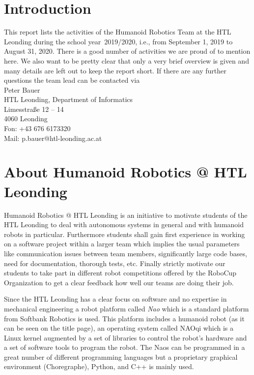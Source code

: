 \documentclass[11pt]{article}
\begin{document}
\tableofcontents
\newpage

\section{Introduction}
This report lists the activities of the Humanoid Robotics Team at the HTL Leonding during the school year~2019/2020, i.e., from September 1, 2019 to August 31, 2020. There is a good number of activities we are proud of to mention here. We also want to be pretty clear that only  a very brief overview is given and many details are left out to keep the report short. If there are any further questions the team lead can be contacted via \\[1em]
Peter Bauer\\
HTL Leonding, Department of Informatics\\
Limesstraße 12 -- 14\\
4060 Leonding\\
Fon: +43 676 6173320\\
Mail: p.bauer@htl-leonding.ac.at

\section{About Humanoid Robotics @ HTL Leonding}\label{sec:about}
Humanoid Robotics @ HTL Leonding is an initiative to motivate students of the HTL Leonding to deal with autonomous systems in general and with humanoid robots in particular. Furthermore students shall gain first experience in working on a software project within a larger team which implies the usual parameters like communication issues between team members, significantly large code bases, need for documentation, thorough tests, etc. Finally strictly motivate our students to take part in different robot competitions offered by the RoboCup Organization to get a clear feedback how well our teams are doing their job.

Since the HTL Leonding has a clear focus on software and no expertise in mechanical engineering a robot platform called {\em Nao} which is a standard platform from Softbank Robotics is used. This platform includes a humanoid robot (as it can be seen on the title page), an operating system called NAOqi which is a Linux kernel augmented by a set of libraries to control the robot's hardware and a set of software tools to program the robot. The Naos can be programmed in a great number of different programming languages but a proprietary graphical environment (Choregraphe), Python, and  C++ is mainly used.
\end{document}
